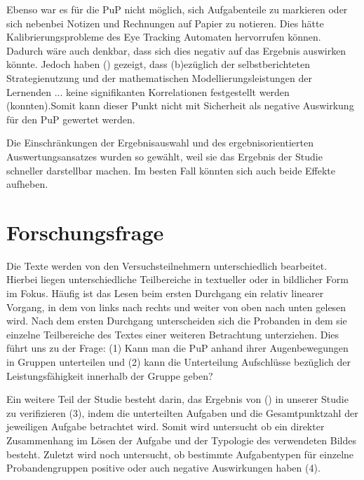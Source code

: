 Ebenso war es für die \gls{PuP} nicht möglich, sich Aufgabenteile zu markieren oder sich nebenbei Notizen und Rechnungen auf Papier zu notieren. Dies hätte Kalibrierungsprobleme des Eye Tracking Automaten hervorrufen können. Dadurch wäre auch denkbar, dass sich dies negativ auf das Ergebnis auswirken könnte. Jedoch haben \citeauthor{schukajlow2011selbstberichtete} () gezeigt, dass \grqq (b)ezüglich der selbstberichteten Strategienutzung und der mathematischen Modellierungsleistungen der Lernenden ... keine signifikanten Korrelationen festgestellt werden (konnten).\grqq Somit kann dieser Punkt nicht mit Sicherheit als negative Auswirkung für den \gls{PuP} gewertet werden. 

Die Einschränkungen der Ergebnisauswahl und des ergebnisorientierten Auswertungsansatzes wurden so gewählt, weil sie das Ergebnis der Studie schneller darstellbar machen. Im besten Fall könnten sich auch beide Effekte aufheben.
\section{Forschungsfrage}

Die Texte werden von den Versuchsteilnehmern unterschiedlich bearbeitet. Hierbei liegen unterschiedliche Teilbereiche in textueller oder in bildlicher Form im Fokus. Häufig ist das Lesen beim ersten Durchgang ein relativ linearer Vorgang, in dem von links nach rechts und weiter von oben nach unten gelesen wird. Nach dem ersten Durchgang unterscheiden sich die Probanden in dem sie einzelne Teilbereiche des Textes einer weiteren Betrachtung unterziehen. Dies führt uns zu der Frage:
(1) Kann man die \gls{PuP} anhand ihrer Augenbewegungen in Gruppen unterteilen und (2) kann die Unterteilung Aufschlüsse bezüglich der Leistungsfähigkeit innerhalb der Gruppe geben?

Ein weitere Teil der Studie besteht darin, das Ergebnis von \citeauthor{bockmannvalue} () in unserer Studie zu verifizieren (3), indem die unterteilten Aufgaben und die Gesamtpunktzahl der jeweiligen Aufgabe betrachtet wird. Somit wird untersucht ob ein direkter Zusammenhang im Lösen der Aufgabe und der Typologie des verwendeten Bildes besteht. Zuletzt wird noch untersucht, ob bestimmte Aufgabentypen für einzelne Probandengruppen positive oder auch negative Auswirkungen haben (4).